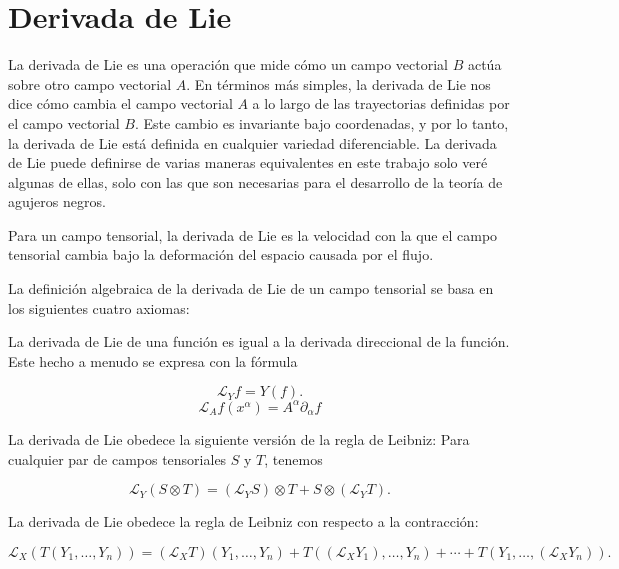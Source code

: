 \section{Derivada de Lie}
La derivada de Lie es una operación que mide cómo un campo vectorial $B$ actúa sobre otro campo vectorial $A$. En términos más simples, la derivada de Lie nos dice cómo cambia el campo vectorial $A$ a lo largo de las trayectorias definidas por el campo vectorial $B$. Este cambio es invariante bajo coordenadas, y por lo tanto, la derivada de Lie está definida en cualquier variedad diferenciable.
La derivada de Lie puede definirse de varias maneras equivalentes en este trabajo solo veré algunas de ellas, solo con las que son necesarias para el desarrollo de la teoría de agujeros negros.

Para un campo tensorial, la derivada de Lie es la velocidad con la que el campo tensorial cambia bajo la deformación del espacio causada por el flujo.

La definición algebraica de la derivada de Lie de un campo tensorial se basa en los siguientes cuatro axiomas:

\begin{axiom}\label{ax:Lie1}
    La derivada de Lie de una función es igual a la derivada direccional de la función. Este hecho a menudo se expresa con la fórmula

    $$
        \mathcal{L}_Y f=Y(f).
    $$
    \begin{equation}
        \mathscr{L}_A f\left(x^\alpha\right)=A^\alpha \partial_\alpha f
    \end{equation}

\end{axiom}

\begin{axiom}\label{ax:Lie2}
    La derivada de Lie obedece la siguiente versión de la regla de Leibniz: Para cualquier par de campos tensoriales $S$ y $T$, tenemos

    $$
        \mathcal{L}_Y(S \otimes T)=\left(\mathcal{L}_Y S\right) \otimes T+S \otimes\left(\mathcal{L}_Y T\right).
    $$
\end{axiom}

\begin{axiom}\label{ax:Lie3}
    La derivada de Lie obedece la regla de Leibniz con respecto a la contracción:

    $$
        \mathcal{L}_X\left(T\left(Y_1, \ldots, Y_n\right)\right)=\left(\mathcal{L}_X T\right)\left(Y_1, \ldots, Y_n\right)+T\left(\left(\mathcal{L}_X Y_1\right), \ldots, Y_n\right)+\cdots+T\left(Y_1, \ldots,\left(\mathcal{L}_X Y_n\right)\right).
    $$
\end{axiom}

